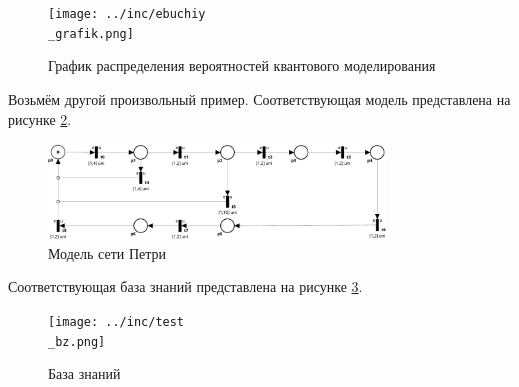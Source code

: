 \begin{figure}[h!]
	\centering
	\texttt{[image: ../inc/ebuchiy\\\_grafik.png]}
	\caption{График распределения вероятностей квантового моделирования}
	\label{plt:time}
\end{figure}


Возьмём другой произвольный пример. Соответствующая модель представлена на рисунке \ref{fig:test}.

\begin{figure}[h!btp]
	\centering
	\includegraphics[width=0.8\textwidth]{../inc/test.pdf}
	\caption{Модель сети Петри}
	\label{fig:test}	
\end{figure}

Соответствующая база знаний представлена на рисунке \ref{fig:testbz}.

\begin{figure}[h!btp]
	\centering
	\texttt{[image: ../inc/test\\\_bz.png]}
	\caption{База знаний}
	\label{fig:testbz}
\end{figure}

